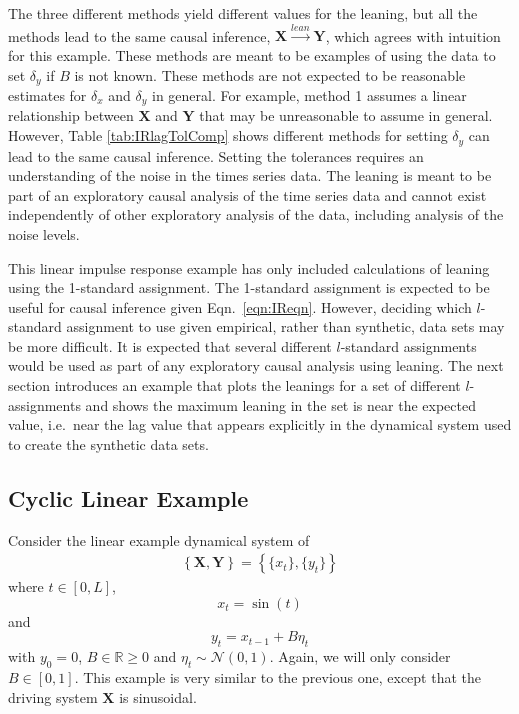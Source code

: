\documentclass[twocolumn,aps,pre,groupedaddress]{revtex4-1}
\begin{document}
The three different methods yield different values for the leaning, but all the methods lead to the same causal inference, $\mathbf{X}\xrightarrow{lean}\mathbf{Y}$, which agrees with intuition for this example.  These methods are meant to be examples of using the data to set $\delta_y$ if $B$ is not known.  These methods are not expected to be reasonable estimates for $\delta_x$ and $\delta_y$ in general.  For example, method 1 assumes a linear relationship between $\mathbf{X}$ and $\mathbf{Y}$ that may be unreasonable to assume in general.  However, Table \ref{tab:IRlagTolComp} shows different methods for setting $\delta_y$ can lead to the same causal inference.  Setting the tolerances requires an understanding of the noise in the times series data.  The leaning is meant to be part of an exploratory causal analysis of the time series data and cannot exist independently of other exploratory analysis of the data, including analysis of the noise levels.  

This linear impulse response example has only included calculations of leaning using the 1-standard assignment.  The 1-standard assignment is expected to be useful for causal inference given Eqn.\ \ref{eqn:IReqn}.  However, deciding which $l$-standard assignment to use given empirical, rather than synthetic, data sets may be more difficult.  It is expected that several different $l$-standard assignments would be used as part of any exploratory causal analysis using leaning.  The next section introduces an example that plots the leanings for a set of different $l$-assignments and shows the maximum leaning in the set is near the expected value, i.e.\ near the lag value that appears explicitly in the dynamical system used to create the synthetic data sets.

\subsection{Cyclic Linear Example}
Consider the linear example dynamical system of
\begin{eqnarray}
\label{eqn:cyceqn}
\left\{\mathbf{X},\mathbf{Y}\right\} = \left\{\{x_t\},\{y_t\}\right\}
\end{eqnarray}
where $t\in[0,L]$,
\begin{equation*}
x_t = \sin(t)
\end{equation*}
and
\begin{equation*}
y_t = x_{t-1} + B\eta_t
\end{equation*}
with $y_0 = 0$, $B\in\mathbb{R}\ge 0$ and $\eta_t\sim\mathcal{N}\left(0,1\right)$.  Again, we will only consider $B\in[0,1]$.  This example is very similar to the previous one, except that the driving system $\mathbf{X}$ is sinusoidal.
\end{document}
